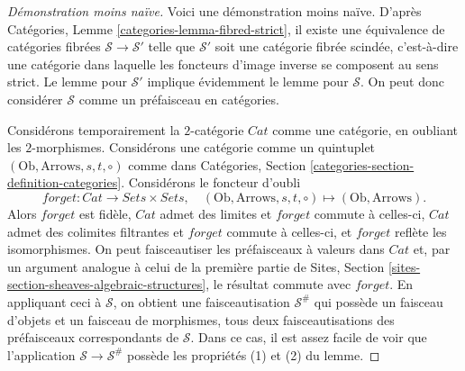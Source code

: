\begin{proof}[Démonstration moins naïve]
Voici une démonstration moins naïve.
D'après Catégories, Lemme \ref{categories-lemma-fibred-strict},
il existe une équivalence de
catégories fibrées $\mathcal{S} \to \mathcal{S}'$ telle que $\mathcal{S}'$
soit une catégorie fibrée scindée, c'est-à-dire une catégorie dans laquelle les foncteurs
d'image inverse se composent au sens strict. Le lemme pour $\mathcal{S}'$
implique évidemment le lemme pour $\mathcal{S}$. On peut donc considérer $\mathcal{S}$
comme un préfaisceau en catégories.

\medskip\noindent
Considérons temporairement la $2$-catégorie $\textit{Cat}$ comme une
catégorie, en oubliant les $2$-morphismes.
Considérons une catégorie comme un quintuplet
$(\text{Ob}, \text{Arrows}, s, t, \circ)$ comme dans
Catégories, Section \ref{categories-section-definition-categories}.
Considérons le foncteur d'oubli
$$
forget : \textit{Cat} \to \textit{Sets} \times \textit{Sets}, \quad
(\text{Ob}, \text{Arrows}, s, t, \circ)
\mapsto
(\text{Ob}, \text{Arrows}).
$$
Alors $forget$ est fidèle, $\textit{Cat}$ admet des limites et
$forget$ commute à celles-ci, $\textit{Cat}$ admet des colimites filtrantes et
$forget$ commute à celles-ci, et $forget$ reflète les isomorphismes.
On peut faisceautiser les préfaisceaux à valeurs dans $\textit{Cat}$ et,
par un argument analogue à celui de la première partie de
Sites, Section \ref{sites-section-sheaves-algebraic-structures},
le résultat commute avec $forget$. En appliquant ceci à
$\mathcal{S}$, on obtient une faisceautisation $\mathcal{S}^\#$
qui possède un faisceau d'objets et un faisceau de morphismes,
tous deux faisceautisations des préfaisceaux correspondants
de $\mathcal{S}$. Dans ce cas, il est assez
facile de voir que l'application $\mathcal{S} \to \mathcal{S}^\#$
possède les propriétés (1) et (2) du lemme.


\end{proof}
